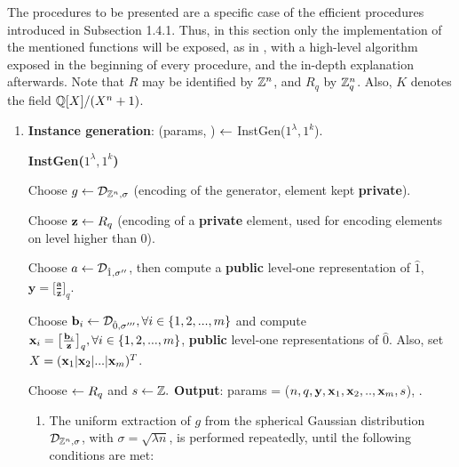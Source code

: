 The procedures to be presented are a specific case of the efficient procedures introduced in Subsection 1.4.1. Thus, in this section only the implementation of the mentioned functions will be exposed, as in \cite{GGH13}, with a high-level algorithm exposed in the beginning of every procedure, and the in-depth explanation afterwards. Note that $R$ may be identified by ${\mathbb Z}^n$, and $R_q$ by ${\mathbb Z}_q^n$. Also, $K$ denotes the field $\mathbb{Q}[X]/(X^{n}+1)$.\\

\begin{enumerate}[label=(\alph*)]
	\item \textbf{Instance generation}: (params, \pzt) $\leftarrow$ InstGen($1^\lambda, 1^k$).
	
	\begin{tcolorbox}[colframe=black,colback=white,arc=0pt,outer arc=0pt]
		\begin{center}
			\textbf{InstGen($1^\lambda, 1^k$)}
		\end{center}
		\begin{algorithmic}[1]
			\State Choose $g \leftarrow \mathcal{D}_{{\mathbb Z}^n, \sigma}$ (encoding of the generator, element kept \textbf{private}).
			\Statex
			
			\State Choose $\textbf{z}\leftarrow R_q$ (encoding of a \textbf{private} element, used for encoding elements on level higher than 0).
			\Statex
			
			\State Choose $a \leftarrow \mathcal{D}_{\hat{1}, \sigma''}$, then compute a \textbf{public} level-one representation of $\hat{1}$, $\textbf{y} = \big[\frac{\textbf{a}}{\textbf{z}}\big]_q$.
			\Statex
			
			\State Choose $\textbf{b}_i \leftarrow \mathcal{D}_{\hat{0}, \sigma'''}, \forall i \in \{1,2,..., m\}$ and compute $\textbf{x}_i = \big[\frac{\textbf{b}_i}{\textbf{z}}\big]_q, \forall i \in \{1,2,..., m\}$, \textbf{public} level-one representations of $\hat{0}$. Also, set  $X = (\textbf{x}_1 | \textbf{x}_2 |...|\textbf{x}_m)^T$.
			\Statex
			
			\State Choose \pzt $\leftarrow R_q$ and $s \leftarrow {\mathbb Z}.$ 
			\Statex
			\State \textbf{Output}: params = ($n, q, \textbf{y}, \textbf{x}_1,\textbf{x}_2,..,\textbf{x}_m, s$), \pzt.
		\end{algorithmic}
	\end{tcolorbox}

	\begin{enumerate}[label=\arabic*:]
		\item The uniform extraction of $g$ from the spherical Gaussian distribution $\mathcal{D}_{{\mathbb Z}^n, \sigma}$, with $\sigma = \sqrt{\lambda n}$, is performed repeatedly, until the following conditions are met:
		

\end{enumerate}
\end{enumerate}

